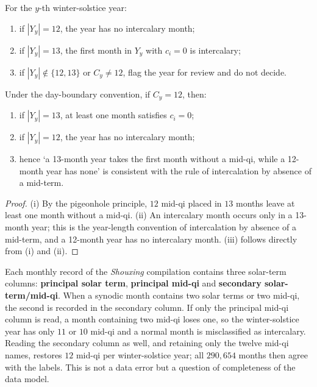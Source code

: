 \begin{definition}
\label{def:exact_wuzhongqi_decision}
For the \(y\)-th winter-solstice year:
\begin{enumerate}[label=(\roman*)]
    \item if \(|Y_y|=12\), the year has no intercalary month;
    \item if \(|Y_y|=13\), the first month in \(Y_y\) with \(c_i=0\) is intercalary;
    \item if \(|Y_y|\notin\{12,13\}\) or \(C_y\ne12\), flag the year for review and do not decide.
\end{enumerate}
\end{definition}

\begin{proposition}
\label{prop:exact_wuzhongqi_consistency}
Under the day-boundary convention, if \(C_y=12\), then:
\begin{enumerate}[label=(\roman*)]
    \item if \(|Y_y|=13\), at least one month satisfies \(c_i=0\);
    \item if \(|Y_y|=12\), the year has no intercalary month;
    \item hence `a 13-month year takes the first month without a mid-qi, while a 12-month year has none' is consistent with the rule of intercalation by absence of a mid-term.
\end{enumerate}
\end{proposition}

\begin{proof}
(i) By the pigeonhole principle, \(12\) mid-qi placed in \(13\) months leave at least one month without a mid-qi. (ii) An intercalary month occurs only in a 13-month year; this is the year-length convention of intercalation by absence of a mid-term, and a 12-month year has no intercalary month. (iii) follows directly from (i) and (ii).
\end{proof}

\begin{remark}
\label{rem:main_secondary_terms}
Each monthly record of the \textit{Shouxing} compilation contains three solar-term columns: \textbf{principal solar term}, \textbf{principal mid-qi} and \textbf{secondary solar-term/mid-qi}. When a synodic month contains two solar terms or two mid-qi, the second is recorded in the secondary column. If only the principal mid-qi column is read, a month containing two mid-qi loses one, so the winter-solstice year has only \(11\) or \(10\) mid-qi and a normal month is misclassified as intercalary. Reading the secondary column as well, and retaining only the twelve mid-qi names, restores \(12\) mid-qi per winter-solstice year; all \(290{,}654\) months then agree with the labels. This is not a data error but a question of completeness of the data model.
\end{remark}

